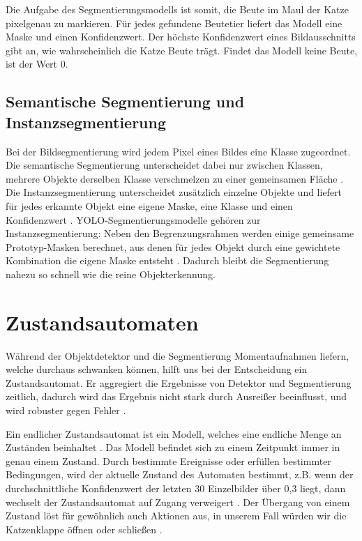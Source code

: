 Die Aufgabe des Segmentierungsmodells ist somit, die Beute im Maul der Katze pixelgenau zu markieren. Für jedes gefundene Beutetier liefert das Modell eine Maske und einen Konfidenzwert. Der höchste Konfidenzwert eines Bildausschnitts gibt an, wie wahrscheinlich die Katze Beute trägt. Findet das Modell keine Beute, ist der Wert 0.

\subsection{Semantische Segmentierung und Instanzsegmentierung}
\label{subsec:instanz}
Bei der Bildsegmentierung wird jedem Pixel eines Bildes eine Klasse zugeordnet. Die semantische Segmentierung unterscheidet dabei nur zwischen Klassen, mehrere Objekte derselben Klasse verschmelzen zu einer gemeinsamen Fläche \cite{long2015fcn}. Die Instanzsegmentierung unterscheidet zusätzlich einzelne Objekte und liefert für jedes erkannte Objekt eine eigene Maske, eine Klasse und einen Konfidenzwert \cite{he2017maskrcnn, minaee2022segmentation}. YOLO-Segmentierungsmodelle gehören zur Instanzsegmentierung: Neben den Begrenzungsrahmen werden einige gemeinsame Prototyp-Masken berechnet, aus denen für jedes Objekt durch eine gewichtete Kombination die eigene Maske entsteht \cite{bolya2019yolact}. Dadurch bleibt die Segmentierung nahezu so schnell wie die reine Objekterkennung.

\section{Zustandsautomaten}
\label{subsec:fsm}

Während der Objektdetektor und die Segmentierung Momentaufnahmen liefern, welche durchaus schwanken können, hilft uns bei der Entscheidung ein Zustandsautomat. Er aggregiert die Ergebnisse von Detektor und Segmentierung zeitlich, dadurch wird das Ergebnis nicht stark durch Ausreißer beeinflusst, und wird robuster gegen Fehler \cite{han2016seqnms, kang2018tcnn}.

Ein endlicher Zustandsautomat ist ein Modell, welches eine endliche Menge an Zuständen beinhaltet \cite{hopcroft2006automata}. Das Modell befindet sich zu einem Zeitpunkt immer in genau einem Zustand. Durch bestimmte Ereignisse oder erfüllen bestimmter Bedingungen, wird der aktuelle Zustand des Automaten bestimmt, z.B. wenn der durchschnittliche Konfidenzwert der letzten 30 Einzelbilder über 0,3 liegt, dann wechselt der Zustandsautomat auf Zugang verweigert \cite{harel1987statecharts}. Der Übergang von einem Zustand löst für gewöhnlich auch Aktionen aus, in unserem Fall würden wir die Katzenklappe öffnen oder schließen \cite{mealy1955method, moore1956gedanken}.

